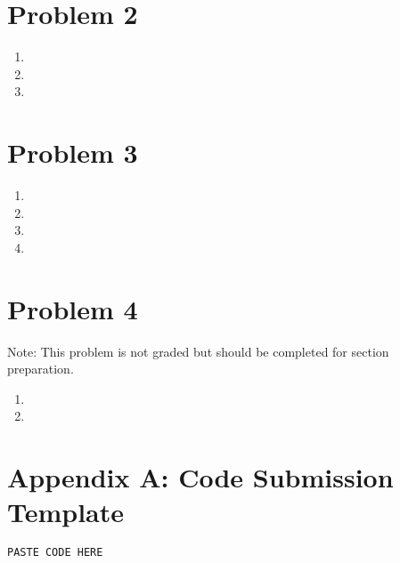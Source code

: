 \documentclass [11pt]{article}
\begin{document}
\section*{Problem 2}
    \begin{enumerate}[label=(\roman*)]
        \item
        \item
        \item
    \end{enumerate}

\section*{Problem 3}
    \begin{enumerate}[label=(\roman*)]
        \item
        \item
        \item
        \item
    \end{enumerate}

\section*{Problem 4}
    Note: This problem is not graded but should be completed for section preparation.
    \begin{enumerate}[label=(\roman*)]
        \item
        \item
    \end{enumerate}



\newpage
\section*{Appendix A: Code Submission Template}
    \begin{lstlisting}[language=Python]
        PASTE CODE HERE
    \end{lstlisting}

    
    
\end{document}
